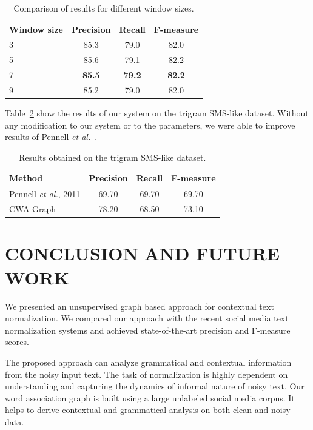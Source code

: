 \documentclass[a4paper,onesided,12pt]{report}
\begin{document}
\begin{table}[thb]
  \caption{Comparison of results for different window sizes.}
  \centering
  \begin{tabular}[th]{|l|c|c|c|}
    \hline
    \textbf{Window size} & \textbf{Precision} & \textbf{Recall} & \textbf{F-measure} \\
    \hline
    3 & 85.3 & 79.0 & 82.0 \\\hline
    5 & 85.6 & 79.1 & 82.2 \\\hline
    7 & \textbf{85.5} &  \textbf{79.2} &  \textbf{82.2} \\\hline
    9 & 85.2 & 79.0  & 82.0 \\\hline
  \end{tabular}
\label{tab:windows}
\end{table}

Table~\ref{tab:resultspennell} show the results of our system on the trigram SMS-like dataset. Without any modification to our system or to the parameters, we were able to improve results of Pennell \textit{et al.}~\cite{pennell2011character}.

\begin{table}[thb]
  \caption{Results obtained on the trigram SMS-like dataset.}
  \centering
  \begin{tabular}[t]{|l|c|c|c|}
    \hline
    \textbf{Method} & \textbf{Precision} & \textbf{Recall} & \textbf{F-measure} \\
    \hline
    Pennell \textit{et al.}, 2011 & 69.70 & 69.70 & 69.70 \\\hline
    CWA-Graph   & 78.20 & 68.50 & 73.10 \\\hline
  \end{tabular}
  \label{tab:resultspennell}
\end{table}

\chapter{CONCLUSION AND FUTURE WORK}

We presented an unsupervised graph based approach for contextual text normalization. We compared our approach with the recent social media text normalization systems and achieved state-of-the-art precision and F-measure scores.

The proposed approach can analyze grammatical and contextual information from the noisy input text. The task of normalization is highly dependent on understanding and capturing the dynamics of informal nature of noisy text. Our word association graph is built using a large unlabeled social media corpus. It helps to derive contextual and grammatical analysis on both clean and noisy data.
\end{document}
